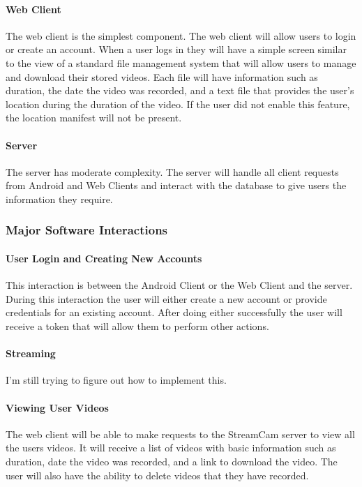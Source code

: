 \documentclass[11pt,a4paper,titlepage]{article}
\begin{document}
\paragraph{Web Client\\}
	The web client is the simplest component. The web client will allow users to login or create an account. When a user logs in they will have a simple screen similar to the view of a standard file management system that will allow users to manage and download their stored videos. Each file will have information such as duration, the date the video was recorded, and a text file that provides the user's location during the duration of the video. If the user did not enable this feature, the location manifest will not be present. 
	
\paragraph{Server\\}
    The server has moderate complexity. The server will handle all client requests from Android and Web Clients and interact with the database to give users the information they require. 
    
\subsubsection{Major Software Interactions}

\paragraph{User Login and Creating New Accounts\\}
This interaction is between the Android Client or the Web Client and the server. During this interaction the user will either create a new account or provide credentials for an existing account. After doing either successfully the user will receive a token that will allow them to perform other actions.

\paragraph{Streaming\\}
I'm still trying to figure out how to implement this.

\paragraph{Viewing User Videos\\}
The web client will be able to make requests to the StreamCam server to view all the users videos. It will receive a list of videos with basic information such as duration, date the video was recorded, and a link to download the video. The user will also have the ability to delete videos that they have recorded.
\end{document}
